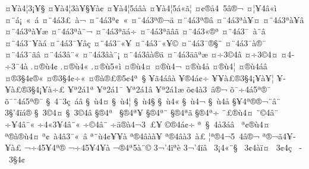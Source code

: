 {^^a4^^a5^^e04^^a63^^a1^^a5^^a7
^^a4^^a5^^e04^^a63^^e0^^a5^^a7^^a5^^e0^^a2
^^a4^^a5^^e04^^a65^^e1^^e2^^e0
^^a4^^a5^^e04^^a65^^e1^^ab^^e3^^a6
^^a4^^a2^^ae^^e54^^a05^^e2^^ae^^ac
^^a4^^a6^^a5^^ad4^^e2^^ab^^ec
^^a4^^a8^^e1^^a1^^a0^^ab^^a0^^ad^^e1
^^a4^^a84^^e13^^a3^^a0^^e0^^ac
^^a4^^a84^^e13^^aa^^a2^^a0^^ab
^^a4^^a84^^e13^^aa^^ae^^ac^^e4
^^a4^^a84^^e13^^aa^^ae^^ad^^e2
^^a4^^a84^^e13^^aa^^e0^^a5^^a4
^^a4^^a84^^e13^^aa^^e0^^a5^^e2
^^a4^^a84^^e13^^aa^^e0^^a5^^e6
^^a4^^a84^^e13^^aa^^e0^^a8^^ac
^^a4^^a84^^e13^^aa^^e3^^e1^^f7
^^a4^^a84^^e13^^aa^^e3^^e2^^e3
^^a4^^a84^^e13^^ab^^ae^^aa
^^a4^^a84^^e13^^af^^a0^^e0^^a8^^e2
^^a4^^a84^^e13^^af^^a5^^e0^^e1
^^a4^^a84^^e13^^af^^a5^^e2^^e7
^^a4^^a84^^e13^^af^^ab^^a5
^^a4^^a84^^e13^^af^^ab^^a5^^a9
^^a4^^a84^^e13^^af^^ae^^a7^^a8
^^a4^^a84^^e13^^af^^e0^^ae^^af
^^a4^^a84^^e13^^af^^e3^^e2
^^a4^^a84^^e13^^e2^^a8^^ab
^^a4^^a84^^e13^^e2^^e0^^a8^^a1
^^a4^^a84^^e13^^e2^^e0^^ae^^e4
^^a4^^a84^^e13^^e4^^e3^^ad^^aa^^e6
^^a4^^f73^^a94^^e2
^^a4^^f73^^a94^^a4
^^a44^^ad^^f73^^af4^^e0
.^^a4^^ae^^f94^^a2
.^^a4^^ae^^f94^^ab
.^^a4^^ae^^f95^^ab^^ec
^^a4^^ae^^f94^^a4
^^a4^^ae^^f94^^ac
^^a4^^ae^^f94^^e5
^^a4^^ae^^f94^^a6
^^a4^^ae^^f94^^e1^^e2
^^a4^^ae3^^a74^^a2^^ae^^ab
^^a4^^ae3^^a74^^a2^^f7^^ab
^^a4^^ae^^e0^^ae^^a3^^ae5^^a24^^aa^^a0^^a7
^^a5^^e34^^e1^^e2^^e0
^^a5^^ae4^^e1^^a2^^f7
^^a5^^ad^^a5^^e0^^a3^^ae3^^a74^^a1^^a5^^e0^^a5^^a6
^^a5^^ad^^a5^^e0^^a3^^ae3^^a74^^a1^^a5^^e0^^f7^^a3
^^a5^^aa2^^e11^^aa
^^a5^^aa2^^e11^^af
^^a5^^aa2^^e11^^e2
^^a5^^aa2^^e11^^e6
^^f5^^a24^^e03^^a0^^e2^^ae^^ac
^^f5^^af^^f74^^e15^^aa^^ae^^af
^^f5^^af^^a84^^e15^^aa^^ae^^af
^^a7^^a04^^af3^^e7^^a0^^e1^^e2
^^a7^^a0^^f94^^a4
^^a7^^a0^^f94^^a6
^^a7^^a0^^f94^^a7
^^a7^^a0^^f94^^ab
^^a7^^a0^^f94^^ac
^^a7^^a0^^f94^^e5
^^a7^^a54^^aa^^ae^^ad^^ae^^ac^^a8^^e2^^a8
3^^a7'4^^ef^^e1^^ae
^^a7^^ad^^a03^^a94^^a4
^^a7^^ad^^a03^^a94^^e2
^^a7^^ae4^^aa^^a0
^^a7^^ae4^^aa^^a5
^^a7^^ae4^^aa^^a8
^^a7^^ae4^^aa^^e3
^^a7^^ae4^^aa^^f7
^^a8^^a3^^ae^^f94^^a4
^^a8^^a94^^e2^^a8
^^f7^^a54^^e2^^a8^^ab
^^f74^^ab3^^a54^^e2^^a8^^ab
^^f7^^a94^^e2^^a8
^^f7^^ad^^e4^^ae^^e04^^ac3^^a0^^a3^^a5^^ad
^^a9^^ae4^^e1^^a2^^f7
^^aa^^a0^^a7^^a04^^e53^^e1^^e2^^a0^^ad
^^aa^^a2^^ae^^f94^^a4
^^aa^^ae^^e0^^ae^^f94^^a4
^^aa^^a2^^a0^^e04^^e23^^af^^ab^^a0^^e2
^^aa^^a8^^f94^^a2^^a5^^ad^^a5^^e0
^^aa^^ae^^ad4^^e2^^e0^^e0^^a5
^^aa^^ae^^ad4^^e2^^e03^^a0^^e0^^a3
^^a6^^aa^^ae4^^ac5^^a04^^e2^^ae^^ac
^^aa^^ae^^ac^^e34^^ad^^a5^^ad^^a5^^e0^^a3
^^ac^^f74^^ad5^^a54^^aa^^ae
^^ac^^f74^^ad5^^a54^^ad^^a5^^e0
^^ac^^ae4^^aa5^^e0^^a8^^a9
3^^ac'4^^ef^^aa^^e8
3^^ac'4^^ef^^e2
^^ad^^a03^^a14^^ab^^a8^^a7
^^ad^^a03^^a24^^e0^^ef^^a4
^^ad^^a03^^a24^^e7^^a0
^^ad^^a03^^a74^^a2
}
